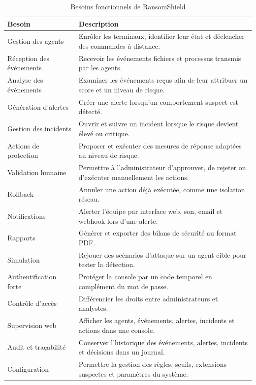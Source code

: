\begin{table}[htbp]
\centering
\caption{Besoins fonctionnels de RansomShield}
\label{tab:besoins-fonctionnels}
\small
\renewcommand{\arraystretch}{1.3}
\begin{tabularx}{\textwidth}{|p{4cm}|X|}
\hline
\textbf{Besoin} & \textbf{Description} \\
\hline
Gestion des agents & Enrôler les terminaux, identifier leur état et déclencher des commandes à distance. \\
\hline
Réception des événements & Recevoir les événements fichiers et processus transmis par les agents. \\
\hline
Analyse des événements & Examiner les événements reçus afin de leur attribuer un score et un niveau de risque. \\
\hline
Génération d'alertes & Créer une alerte lorsqu'un comportement suspect est détecté. \\
\hline
Gestion des incidents & Ouvrir et suivre un incident lorsque le risque devient élevé ou critique. \\
\hline
Actions de protection & Proposer et exécuter des mesures de réponse adaptées au niveau de risque. \\
\hline
Validation humaine & Permettre à l'administrateur d'approuver, de rejeter ou d'exécuter manuellement les actions. \\
\hline
Rollback & Annuler une action déjà exécutée, comme une isolation réseau. \\
\hline
Notifications & Alerter l'équipe par interface web, son, email et webhook lors d'une alerte. \\
\hline
Rapports & Générer et exporter des bilans de sécurité au format PDF. \\
\hline
Simulation & Rejouer des scénarios d'attaque sur un agent cible pour tester la détection. \\
\hline
Authentification forte & Protéger la console par un code temporel en complément du mot de passe. \\
\hline
Contrôle d'accès & Différencier les droits entre administrateurs et analystes. \\
\hline
Supervision web & Afficher les agents, événements, alertes, incidents et actions dans une console. \\
\hline
Audit et traçabilité & Conserver l'historique des événements, alertes, incidents et décisions dans un journal. \\
\hline
Configuration & Permettre la gestion des règles, seuils, extensions suspectes et paramètres du système. \\
\hline
\end{tabularx}
\end{table}
\newpage

